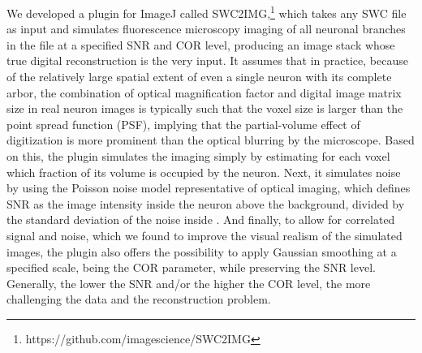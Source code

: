 We developed a plugin for ImageJ \cite{schneider2012} called SWC2IMG,\footnote{https://github.com/imagescience/SWC2IMG} which takes any SWC file as input and simulates fluorescence microscopy imaging of all neuronal branches in the file at a specified SNR and COR level, producing an image stack whose true digital reconstruction is the very input. It assumes that in practice, because of the relatively large spatial extent of even a single neuron with its complete arbor, the combination of optical magnification factor and digital image matrix size in real neuron images is typically such that the voxel size is larger than the point spread function (PSF), implying that the partial-volume effect of digitization is more prominent than the optical blurring by the microscope. Based on this, the plugin simulates the imaging simply by estimating for each voxel which fraction of its volume is occupied by the neuron. Next, it simulates noise by using the Poisson noise model representative of optical imaging, which defines SNR as the image intensity inside the neuron above the background, divided by the standard deviation of the noise inside \cite{sheppard2006}. And finally, to allow for correlated signal and noise, which we found to improve the visual realism of the simulated images, the plugin also offers the possibility to apply Gaussian smoothing at a specified scale, being the COR parameter, while preserving the SNR level. Generally, the lower the SNR and/or the higher the COR level, the more challenging the data and the reconstruction problem.

